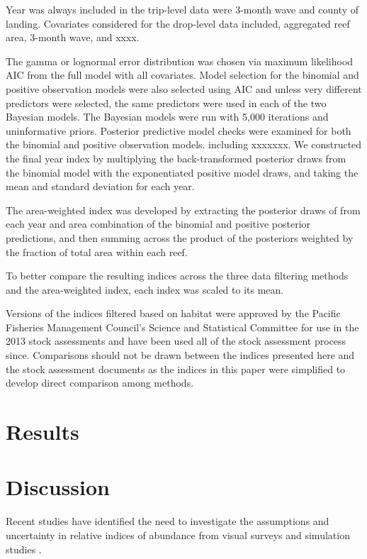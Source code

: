 \documentclass[
  authoryear,
  preprint,
  3p]{elsarticle}
\begin{document}
Year was always included in the trip-level data were 3-month wave and
county of landing. Covariates considered for the drop-level data
included, aggregated reef area, 3-month wave, and xxxx.

The gamma or lognormal error distribution was chosen via maximum
likelihood AIC from the full model with all covariates. Model selection
for the binomial and positive observation models were also selected
using AIC and unless very different predictors were selected, the same
predictors were used in each of the two Bayesian models. The Bayesian
models were run with 5,000 iterations and uninformative priors.
Posterior predictive model checks were examined for both the binomial
and positive observation models. including xxxxxxx. We constructed the
final year index by multiplying the back-transformed posterior draws
from the binomial model with the exponentiated positive model draws, and
taking the mean and standard deviation for each year.

The area-weighted index was developed by extracting the posterior draws
of from each year and area combination of the binomial and positive
posterior predictions, and then summing across the product of the
posteriors weighted by the fraction of total area within each reef.

To better compare the resulting indices across the three data filtering
methods and the area-weighted index, each index was scaled to its mean.

Versions of the indices filtered based on habitat were approved by the
Pacific Fisheries Management Council's Science and Statistical Committee
for use in the 2013 stock assessments and have been used all of the
stock assessment process since. Comparisons should not be drawn between
the indices presented here and the stock assessment documents as the
indices in this paper were simplified to develop direct comparison among
methods.

\hypertarget{results}{%
\section{Results}\label{results}}

\hypertarget{discussion}{%
\section{Discussion}\label{discussion}}

Recent studies have identified the need to investigate the assumptions
and uncertainty in relative indices of abundance from visual surveys
\citep{Bacheler:2015:ERA, Campbell:2015:CRA} and simulation studies
\citep{Siegfried:2016:ISA}.
\end{document}
